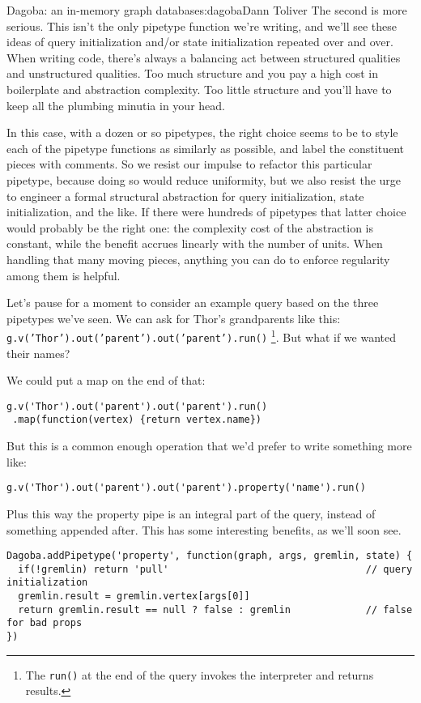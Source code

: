 \begin{aosachapter}{Dagoba: an in-memory graph database}{s:dagoba}{Dann Toliver}
The second is more serious. This isn't the only pipetype function we're
writing, and we'll see these ideas of query initialization and/or state
initialization repeated over and over. When writing code, there's always
a balancing act between structured qualities and unstructured qualities.
Too much structure and you pay a high cost in boilerplate and
abstraction complexity. Too little structure and you'll have to keep all
the plumbing minutia in your head.

In this case, with a dozen or so pipetypes, the right choice seems to be
to style each of the pipetype functions as similarly as possible, and
label the constituent pieces with comments. So we resist our impulse to
refactor this particular pipetype, because doing so would reduce
uniformity, but we also resist the urge to engineer a formal structural
abstraction for query initialization, state initialization, and the
like. If there were hundreds of pipetypes that latter choice would
probably be the right one: the complexity cost of the abstraction is
constant, while the benefit accrues linearly with the number of units.
When handling that many moving pieces, anything you can do to enforce
regularity among them is helpful.

\label{property}

Let's pause for a moment to consider an example query based on the three
pipetypes we've seen. We can ask for Thor's grandparents like this:
\texttt{g.v('Thor').out('parent').out('parent').run()} \footnote{The
  \texttt{run()} at the end of the query invokes the interpreter and
  returns results.}. But what if we wanted their names?

We could put a map on the end of that:

\begin{verbatim}
g.v('Thor').out('parent').out('parent').run()
 .map(function(vertex) {return vertex.name})
\end{verbatim}

But this is a common enough operation that we'd prefer to write
something more like:

\begin{verbatim}
g.v('Thor').out('parent').out('parent').property('name').run()
\end{verbatim}

Plus this way the property pipe is an integral part of the query,
instead of something appended after. This has some interesting benefits,
as we'll soon see.

\begin{verbatim}
Dagoba.addPipetype('property', function(graph, args, gremlin, state) {
  if(!gremlin) return 'pull'                                  // query initialization
  gremlin.result = gremlin.vertex[args[0]]
  return gremlin.result == null ? false : gremlin             // false for bad props
})
\end{verbatim}


\end{aosachapter}
